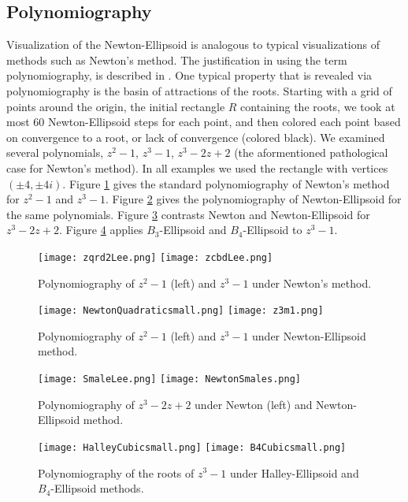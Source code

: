 \documentclass{article}
\begin{document}
\subsection{Polynomiography}
Visualization of the Newton-Ellipsoid is analogous to typical visualizations of methods such as Newton's method.  The justification in using the term polynomiography, is described in \cite{kalbook}. One typical property that is revealed via polynomiography is the basin of attractions of the roots. Starting with a grid of points around the origin, the initial rectangle $R$ containing the roots,  we took at most  60 Newton-Ellipsoid steps for each point, and then colored each point based on convergence to a root,
or lack of convergence (colored black). We examined several polynomials, $z^2-1$, $z^3-1$, $z^3-2z+2$ (the aformentioned pathological case for Newton's method). In all examples we used the rectangle with vertices $(\pm 4, \pm 4i)$. Figure \ref{FigNewton} gives the standard polynomiography of Newton's method for $z^2-1$ and $z^3-1$. Figure \ref{Newton-Ellipsoid} gives the polynomiography of Newton-Ellipsoid for the same polynomials.  Figure \ref{NE-Smale} contrasts Newton and Newton-Ellipsoid  for $z^3-2z+2$.
Figure \ref{HE-B4E} applies $B_3$-Ellipsoid and $B_4$-Ellipsoid to $z^3-1$.

\begin{figure}[h!]
\centering
\texttt{[image: zqrd2Lee.png]}
\texttt{[image: zcbdLee.png]}
\caption{Polynomiography of $z^2-1$ (left) and $z^3-1$ under Newton's method.} \label{FigNewton}
\end{figure}


\begin{figure}[h!]
\centering
\texttt{[image: NewtonQuadraticsmall.png]}
\texttt{[image: z3m1.png]}
\caption{Polynomiography of $z^2-1$ (left) and $z^3-1$ under Newton-Ellipsoid method.} \label{Newton-Ellipsoid}
\end{figure}


\begin{figure}[h!]
\centering
\texttt{[image: SmaleLee.png]}
\texttt{[image: NewtonSmales.png]}
\caption{Polynomiography of $z^3-2z+2$ under Newton (left) and Newton-Ellipsoid method.} \label{NE-Smale}
\end{figure}


\begin{figure}[h!]
\centering
\texttt{[image: HalleyCubicsmall.png]}
\texttt{[image: B4Cubicsmall.png]}
\caption{Polynomiography of the roots of $z^3-1$ under Halley-Ellipsoid and $B_4$-Ellipsoid methods.} \label{HE-B4E}
\end{figure}
\end{document}
